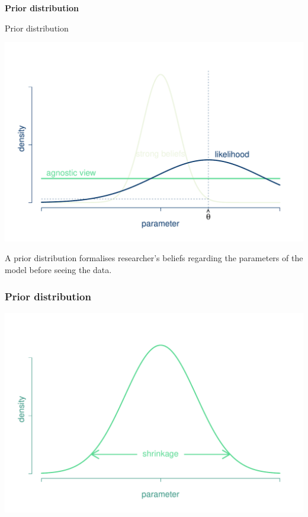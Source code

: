 \documentclass[notes,blackandwhite,mathsans]{beamer}
\begin{document}
{
\begin{frame}

\begin{adjustwidth}{-0.5cm}{0cm}
\vspace{8.3cm}\Large
\textbf{{\color{mcxs2}Prior} {\color{mcxs3}distribution}}
\end{adjustwidth}

\end{frame}
}
 

{
\begin{frame}{\color{mcxs1}Prior distribution}

\begin{center}
\includegraphics[scale=0.4]{grphs/priors.pdf}
\end{center}

{\color{mcxs1}A prior distribution formalises researcher's beliefs regarding the parameters of the model before seeing the data.}

\end{frame}
}


{
\begin{frame}
\frametitle{Prior distribution}

\centering
\includegraphics[scale=0.45]{grphs/shrinkage.pdf}

\end{frame}
}
\end{document}
